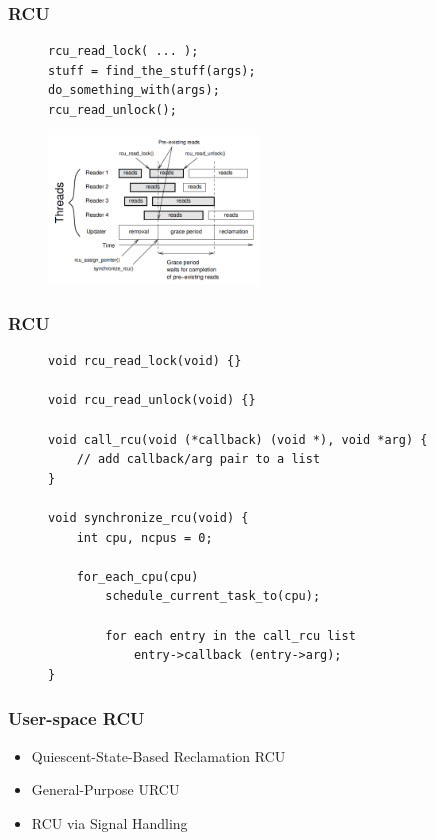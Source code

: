 \documentclass[aspectratio=169, pdf, 8pt, unicode]{beamer}
\begin{document}
\begin{frame}[fragile]
\frametitle{RCU}
\begin{figure}[H]
\centering
\begin{minipage}{0.8\textwidth}
\small
\begin{verbatim}
rcu_read_lock( ... );
stuff = find_the_stuff(args);
do_something_with(args);
rcu_read_unlock();
\end{verbatim}
\end{minipage}%
\end{figure}
\begin{figure}
\includegraphics[width=0.5\textwidth]{fig/rcu.png}
\end{figure}
\end{frame}

\begin{frame}[fragile]
\frametitle{RCU}
\begin{figure}[H]
\centering
\begin{minipage}{0.8\textwidth}
\small
\begin{verbatim}
void rcu_read_lock(void) {}

void rcu_read_unlock(void) {}

void call_rcu(void (*callback) (void *), void *arg) {
    // add callback/arg pair to a list
}

void synchronize_rcu(void) {
    int cpu, ncpus = 0;

    for_each_cpu(cpu)
        schedule_current_task_to(cpu);

        for each entry in the call_rcu list
            entry->callback (entry->arg);
}
\end{verbatim}
\end{minipage}%
\end{figure}
\end{frame}

\begin{frame}[fragile]
\frametitle{User-space RCU}
\begin{itemize}
\item Quiescent-State-Based Reclamation RCU
\item General-Purpose URCU
\item RCU via Signal Handling
\end{itemize}
\end{frame}
\end{document}
